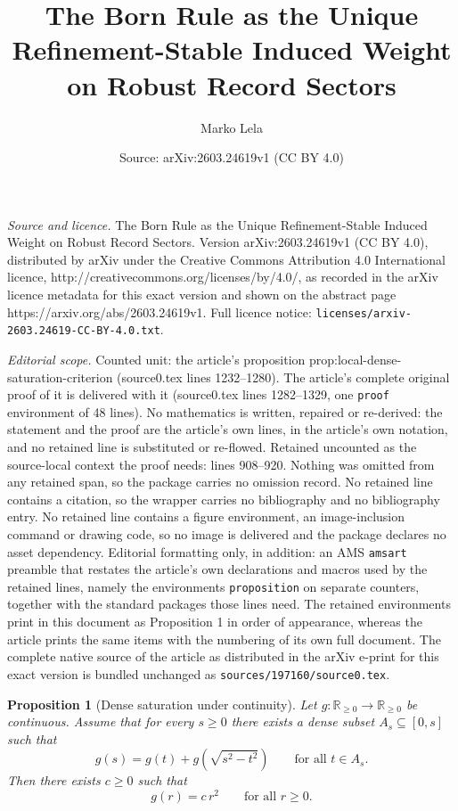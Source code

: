 \documentclass[10pt,a4paper]{amsart}
\title{The Born Rule as the Unique Refinement-Stable Induced Weight on Robust Record Sectors}
\author{Marko Lela}
\date{Source: arXiv:2603.24619v1 (CC BY 4.0)}
\newtheorem{proposition}{Proposition}
\newcommand{\RR}{\mathbb{R}}
\begin{document}
\maketitle

\noindent\emph{Source and licence.} The Born Rule as the Unique Refinement-Stable Induced Weight on Robust Record Sectors. Version arXiv:2603.24619v1 (CC BY 4.0), distributed by arXiv under the Creative Commons Attribution 4.0 International licence, http://creativecommons.org/licenses/by/4.0/, as recorded in the arXiv licence metadata for this exact version and shown on the abstract page https://arxiv.org/abs/2603.24619v1. Full licence notice: \texttt{licenses/arxiv-2603.24619-CC-BY-4.0.txt}.\par\smallskip

\noindent\textit{Editorial scope.} Counted unit: the article's proposition prop:local-dense-saturation-criterion (source0.tex lines 1232--1280). The article's complete original proof of it is delivered with it (source0.tex lines 1282--1329, one \texttt{proof} environment of 48 lines). No mathematics is written, repaired or re-derived: the statement and the proof are the article's own lines, in the article's own notation, and no retained line is substituted or re-flowed.  Retained uncounted as the source-local context the proof needs: lines 908--920.  Nothing was omitted from any retained span, so the package carries no omission record.  No retained line contains a citation, so the wrapper carries no bibliography and no bibliography entry.  No retained line contains a figure environment, an image-inclusion command or drawing code, so no image is delivered and the package declares no asset dependency.  Editorial formatting only, in addition: an AMS \texttt{amsart} preamble that restates the article's own declarations and macros used by the retained lines, namely the environments \texttt{proposition} on separate counters, together with the standard packages those lines need.  The retained environments print in this document as Proposition 1 in order of appearance, whereas the article prints the same items with the numbering of its own full document.  The complete native source of the article as distributed in the arXiv e-print for this exact version is bundled unchanged as \texttt{sources/197160/source0.tex}.
\begin{proposition}[Dense saturation under continuity]
\label{prop:dense-saturation}
Let $g:\RR_{\geq 0}\to\RR_{\geq 0}$ be continuous. Assume that for every $s\ge 0$ there exists a dense subset $A_s\subseteq[0,s]$ such that
\[
g(s)=g(t)+g\!\left(\sqrt{s^{2}-t^{2}}\right)
\qquad\text{for all } t\in A_s .
\]
Then there exists $c\ge 0$ such that
\[
g(r)=c\,r^{2}
\qquad\text{for all } r\ge 0.
\]
\end{proposition}
\end{document}
